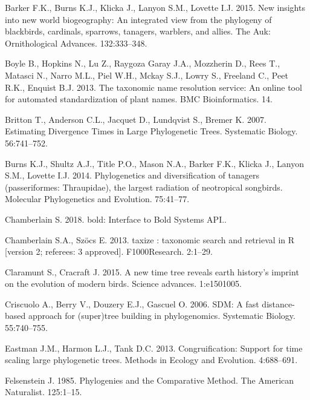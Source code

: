 \documentclass[]{article}
\begin{document}
\leavevmode\hypertarget{ref-barker2015new}{}%
Barker F.K., Burns K.J., Klicka J., Lanyon S.M., Lovette I.J. 2015. New insights into new world biogeography: An integrated view from the phylogeny of blackbirds, cardinals, sparrows, tanagers, warblers, and allies. The Auk: Ornithological Advances. 132:333--348.

\leavevmode\hypertarget{ref-Boyle2013}{}%
Boyle B., Hopkins N., Lu Z., Raygoza Garay J.A., Mozzherin D., Rees T., Matasci N., Narro M.L., Piel W.H., Mckay S.J., Lowry S., Freeland C., Peet R.K., Enquist B.J. 2013. The taxonomic name resolution service: An online tool for automated standardization of plant names. BMC Bioinformatics. 14.

\leavevmode\hypertarget{ref-Britton2007}{}%
Britton T., Anderson C.L., Jacquet D., Lundqvist S., Bremer K. 2007. Estimating Divergence Times in Large Phylogenetic Trees. Systematic Biology. 56:741--752.

\leavevmode\hypertarget{ref-burns2014phylogenetics}{}%
Burns K.J., Shultz A.J., Title P.O., Mason N.A., Barker F.K., Klicka J., Lanyon S.M., Lovette I.J. 2014. Phylogenetics and diversification of tanagers (passeriformes: Thraupidae), the largest radiation of neotropical songbirds. Molecular Phylogenetics and Evolution. 75:41--77.

\leavevmode\hypertarget{ref-Chamberlain2018}{}%
Chamberlain S. 2018. bold: Interface to Bold Systems API..

\leavevmode\hypertarget{ref-Chamberlain2013}{}%
Chamberlain S.A., Szöcs E. 2013. taxize : taxonomic search and retrieval in R {[}version 2; referees: 3 approved{]}. F1000Research. 2:1--29.

\leavevmode\hypertarget{ref-claramunt2015new}{}%
Claramunt S., Cracraft J. 2015. A new time tree reveals earth history's imprint on the evolution of modern birds. Science advances. 1:e1501005.

\leavevmode\hypertarget{ref-Criscuolo2006}{}%
Criscuolo A., Berry V., Douzery E.J., Gascuel O. 2006. SDM: A fast distance-based approach for (super)tree building in phylogenomics. Systematic Biology. 55:740--755.

\leavevmode\hypertarget{ref-Eastman2013}{}%
Eastman J.M., Harmon L.J., Tank D.C. 2013. Congruification: Support for time scaling large phylogenetic trees. Methods in Ecology and Evolution. 4:688--691.

\leavevmode\hypertarget{ref-Felsenstein1985a}{}%
Felsenstein J. 1985. Phylogenies and the Comparative Method. The American Naturalist. 125:1--15.
\end{document}
